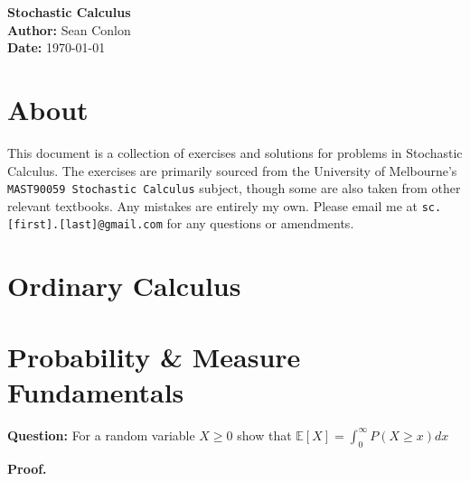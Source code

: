 \documentclass{article}
\begin{document}
\begin{titlepage}
    \centering
    {\Huge \textbf{Stochastic Calculus}}\\[1.5cm] %
    \textbf{Author:} Sean Conlon\\[1cm] %
    \textbf{Date:} \today\\[3cm] %
    
    \section*{About}
    This document is a collection of exercises and solutions for problems in Stochastic Calculus. The exercises are primarily sourced from the University of Melbourne's \texttt{MAST90059 Stochastic Calculus} subject, though some are also taken from other relevant textbooks. Any mistakes are entirely my own. Please email me at \texttt{sc.[first].[last]@gmail.com} for any questions or amendments.\\[2cm]

    \tableofcontents
    
\end{titlepage}

\newpage
\section{Ordinary Calculus}

\newpage
\section{Probability \& Measure Fundamentals}

\begin{tcolorbox}[colframe=black,colback=gray!5,boxrule=0.5pt]
\textbf{Question:} For a random variable $X\geq0$ show that $\mathbb{E}[X] = \int_{0}^{\infty}P(X\geq x)dx$
\end{tcolorbox}
\textbf{Proof.}
\end{document}
